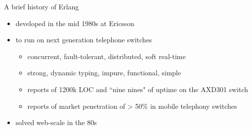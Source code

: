 \documentclass[
  ignorenonframetext,
  aspectratio=169]{beamer}
\providecommand{\tightlist}{%
  \setlength{\itemsep}{0pt}\setlength{\parskip}{0pt}}
\begin{document}
\begin{frame}{A brief history of Erlang}
\label{a-brief-history-of-erlang-3}
\begin{itemize}
\tightlist
\item
  developed in the mid 1980s at Ericsson
\item
  to run on next generation telephone switches

  \begin{itemize}
  \tightlist
  \item
    concurrent, fault-tolerant, distributed, soft real-time
  \item
    strong, dynamic typing, impure, functional, simple
  \item
    reports of 1200k LOC and ``nine nines" of uptime on the AXD301
    switch
  \item
    reports of market penetration of \textgreater{} 50\% in mobile
    telephony switches
  \end{itemize}
\item
  solved web-scale in the \textquotesingle80s
\end{itemize}


\end{frame}
\end{document}
